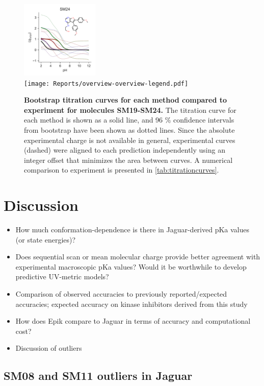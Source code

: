 \documentclass[9pt,lineno,final]{elife}
\begin{document}
\begin{figure}[hbt]
	\includegraphics[width=0.33\textwidth]{Reports/overview-SM24-titration-bootstrap-molecule.pdf}	 \\
    \texttt{[image: Reports/overview-overview-legend.pdf]}

	\caption{{\bf Bootstrap titration curves for each method compared to experiment for molecules SM19-SM24.} The titration curve for each method is shown as a solid line, and 96 \% confidence intervals from bootstrap have been shown as dotted lines. Since the absolute experimental charge is not available in general, experimental curves (dashed) were aligned to each prediction independently using an integer offset that minimizes the area between curves. A numerical comparison to experiment is presented in \cref{tab:titrationcurves}.
	\label{fig:charge-curves3}}
	

\end{figure}


\section{Discussion}


\begin{itemize}
	\item How much conformation-dependence is there in Jaguar-derived pKa values (or state energies)?
	\item Does sequential scan or mean molecular charge provide better agreement with experimental macroscopic pKa values? Would it be worthwhile to develop predictive UV-metric models?
	\item Comparison of observed accuracies to previously reported/expected accuracies; expected accuracy on kinase inhibitors derived from this study
	\item How does Epik compare to Jaguar in terms of accuracy and computational cost?
	\item Discussion of outliers
\end{itemize}



\subsection{SM08 and SM11 outliers in Jaguar}
\end{document}
